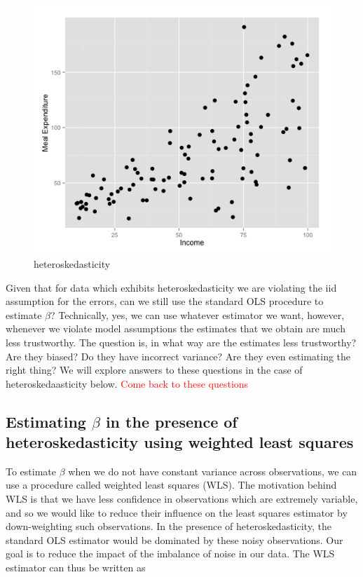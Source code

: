 \begin{figure}[H]
\begin{center}
\includegraphics[scale=0.4]{heteroskedasticity.png}
\end{center}
\caption{heteroskedasticity}
\label{fig:heteroskedasticity}
\end{figure}


Given that for data which exhibits heteroskedasticity we are violating the iid assumption for the errors, can we still use the standard OLS procedure to estimate $\beta$? Technically, yes, we can use whatever estimator we want, however, whenever we violate model assumptions the estimates that we obtain are much less trustworthy. The question is, in what way are the estimates less trustworthy? Are they biased? Do they have incorrect variance? Are they even estimating the right thing? We will explore answers to these questions in the case of heteroskedaasticity below. \textcolor{red}{Come back to these questions}


\subsection*{Estimating $\beta$ in the presence of heteroskedasticity using weighted least squares}

To estimate $\beta$ when we do not have constant variance across observations, we can use a procedure called weighted least squares (WLS). The motivation behind WLS is that we have less confidence in observations which are extremely variable, and so we would like to reduce their influence on the least squares estimator by down-weighting such observations. In the presence of heteroskedasticity, the standard OLS estimator would be dominated by these noisy observations. Our goal is to reduce the impact of the imbalance of noise in our data. The WLS estimator can thus be written as

